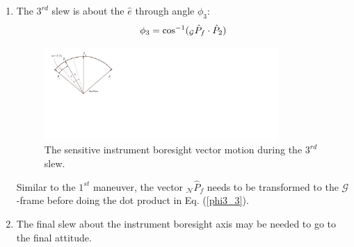 \documentclass[letterpaper, paper,12pt]{AAS}		%
\begin{document}
\begin{enumerate}
		
		\item The $3^{rd}$ slew is about the $\hat{e}$ through angle $\phi_3$:
		\begin{equation}\label{phi3_3}
		\phi_3 = \cos^{-1}(_\mathcal{G}\hat{P}_f\cdot\hat{P}_2)\\
		\end{equation}
		\begin{figure}[H]
			\begin{center}
				\includegraphics[width=3.5in]{./Figures/SVAS_4r}
					\caption{The sensitive instrument boresight vector motion during the $3^{rd}$ slew.}
			\end{center}
		\end{figure}
		Similar to the $1^{st}$ maneuver, the vector $_\mathcal{N}\hat{P}_f$ needs to be transformed to the $\mathcal{G}$-frame before doing the dot product in Eq. (\ref{phi3_3}). 
		\item The final slew about the instrument boresight axis may be needed to go to the final attitude. 
	\end{enumerate}
	
	
\end{document}
